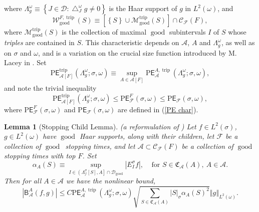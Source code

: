 \documentclass{amsart}%
\theoremstyle{plain}
\newtheorem{lemma}[theorem]{Lemma}
\numberwithin{equation}{section}
\begin{document}
where $\Lambda_{g}^{\omega}\equiv\left\{  J\in\mathcal{D}:\bigtriangleup
_{J}^{\omega}g\neq0\right\}  $ is the Haar support of $g$ in $L^{2}\left(
\omega\right)  $, and%
\[
\mathcal{W}_{\operatorname{good}}^{F,\operatorname*{trip}}\left(  S\right)
\equiv\left[  \left\{  S\right\}  \cup\mathcal{M}_{\operatorname{good}%
}^{\operatorname*{trip}}\left(  S\right)  \right]  \cap\mathcal{C}%
_{\mathcal{F}}\left(  F\right)  ,
\]
where $\mathcal{M}_{\operatorname{good}}^{\operatorname*{trip}}\left(
S\right)  $ is the collection of maximal $\operatorname{good}$ subintervals
$I$ of $S$ whose \emph{triples} are contained in $S$. This characteristic
depends on $\mathcal{A}$, $A$ and $\Lambda_{g}^{\omega}$, as well as on
$\sigma$ and $\omega$, and is a variation on the crucial size function
introduced by M. Lacey in \cite{Lac}. Set
\[
\mathrm{P}\mathsf{E}_{\mathcal{A}\left[  F\right]  }^{\operatorname*{trip}%
}\left(  \Lambda_{g}^{\omega};\sigma,\omega\right)  \equiv\sup_{A\in
\mathcal{A}\left[  F\right]  }\mathrm{P}\mathsf{E}_{\mathcal{A}}%
^{A,\operatorname*{trip}}\left(  \Lambda_{g}^{\omega};\sigma,\omega\right)  ,
\]
and note the trivial inequality
\begin{equation}
\mathrm{P}\mathsf{E}_{\mathcal{A}\left[  F\right]  }^{\operatorname*{trip}%
}\left(  \Lambda_{g}^{\omega};\sigma,\omega\right)  \leq\mathrm{P}%
\mathsf{E}_{\mathcal{F}}^{F}\left(  \sigma,\omega\right)  \leq\mathrm{P}%
\mathsf{E}_{\mathcal{F}}\left(  \sigma,\omega\right)  ,\label{triv inequ}%
\end{equation}
where $\mathrm{P}\mathsf{E}_{\mathcal{F}}^{F}\left(  \sigma,\omega\right)  $
and $\mathrm{P}\mathsf{E}_{\mathcal{F}}\left(  \sigma,\omega\right)  $ are
defined in (\ref{PE char}).

\begin{lemma}
[Stopping Child Lemma]\label{straddle 3}(a reformulation of \cite[Lemmas 3.19
and 3.26]{Lac}) Let $f\in L^{2}\left(  \sigma\right)  $, $g\in L^{2}\left(
\omega\right)  $ have $\operatorname{good}$ Haar supports, along with their
children, let $\mathcal{F}$ be a collection of $\operatorname{good}$\ stopping
times, and let $\mathcal{A}\subset\mathcal{C}_{\mathcal{F}}\left(  F\right)  $
be a collection of $\operatorname{good}$ stopping times with top $F$. Set
\[
\alpha_{A}\left(  S\right)  \equiv\sup_{I\in\left(  \Lambda_{f}^{\sigma}
\left[  S\right]  ,A\right]  \cap\mathcal{D}_{\operatorname{good}}}\left\vert
E_{I}^{\sigma}f\right\vert ,\ \ \ \ \ \text{for }S\in\mathfrak{C}%
_{\mathcal{A}}\left(  A\right)  ,\ A\in\mathcal{A}.
\]
Then for all $A\in\mathcal{A}$ we have the nonlinear bound,
\[
\left\vert \mathsf{B}_{\mathcal{A}}^{A}\left(  f,g\right)  \right\vert \leq
C\mathrm{P}\mathsf{E}_{\mathcal{A}}^{A,\operatorname*{trip}}\left(
\Lambda_{g}^{\omega};\sigma,\omega\right)  \sqrt{\sum_{S\in\mathfrak{C}%
_{\mathcal{A}}\left(  A\right)  }\left\vert S\right\vert _{\sigma}\alpha
_{A}\left(  S\right)  ^{2}}\left\Vert g\right\Vert _{L^{2}\left(
\omega\right)  }.
\]

\end{lemma}
\end{document}
